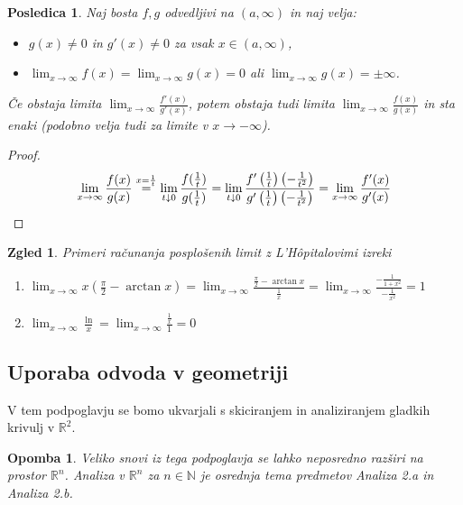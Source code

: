 \documentclass[10pt, a4paper]{article}
\newtheorem{posledica}[izr]{Posledica}
\newtheorem*{opomba}{Opomba}
\newtheorem{zgled}[izr]{Zgled}
\newenvironment{noticeC}{%
  \tcolorbox[%
  notitle,
  empty,
  enhanced,  %
  breakable,
  coltext=black, 
  fontupper=\rmfamily,
  noparskip,
  sharp corners,
  boxrule=-1pt,  %
  frame hidden,
  left=7pt,  %
  right=7pt,
  top=5pt,
  bottom=5pt,
  before skip=2.5ex plus 2pt,
  after skip=2.5ex plus 2pt,
  overlay unbroken and last={%
  },
  ]}
{\endtcolorbox}
\newenvironment{dokaz}%
  {\begin{noticeC}\begin{proof}}%
  {\end{proof}\end{noticeC}}
\newcommand{\N}{\mathbb {N}}
\newcommand{\R}{\mathbb {R}}
\newcommand{\limf}[3]{\lim_{#1 \to #2} {#3}}
\newcommand{\rlimf}[3]{\lim_{#1 \downarrow #2} {#3}}
\begin{document}
\begin{posledica}
    Naj bosta $f,g$ odvedljivi na $(a, \infty)$ in naj velja:
    \begin{itemize}
        \item $g(x) \neq 0$ in $g'(x) \neq 0$ za vsak $x \in (a,\infty)$,
        \item $\displaystyle \limf{x}{\infty}{f(x)} = \limf{x}{\infty}{g(x)} = 0$ ali $\limf{x}{\infty}{g(x)} = \pm \infty$.
    \end{itemize}
    Če obstaja limita $\limf{x}{\infty}{\frac{f'(x)}{g'(x)}}$, potem obstaja tudi limita $\limf{x}{\infty}{\frac{f(x)}{g(x)}}$ in sta enaki (podobno velja tudi za limite v $x \rightarrow - \infty$).
\end{posledica}
    
\begin{dokaz}
    \begin{equation*}
        \limf{x}{\infty}{\frac{f(x)}{g(x)}} \stackrel{x = \frac{1}{t}}{=} \rlimf{t}{0}{\frac{f(\frac{1}{t})}{g(\frac{1}{t})}} = \rlimf{t}{0}{\frac{f' \left(\frac{1}{t} \right) \left(- \frac{1}{t^2} \right)}{g' \left(\frac{1}{t} \right) \left(- \frac{1}{t^2} \right)}} = \limf{x}{\infty}{\frac{f'(x)}{g'(x)}} \qedhere
    \end{equation*}
\end{dokaz}
\clearpage
    \begin{zgled}
    Primeri računanja posplošenih limit z L'Hôpitalovimi izreki
    \begin{enumerate}
        \item $\displaystyle \limf{x}{\infty}{x \left(\frac{\pi}{2} - \arctan x\right)} = \limf{x}{\infty}{\frac{\frac{\pi}{2} - \arctan x}{\frac{1}{x}}} = \limf{x}{\infty}{\frac{- \frac{1}{1 + x^2}}{- \frac{1}{x^2}}} = 1$
        \item $\displaystyle \limf{x}{\infty}{\frac{\ln}{x}} = \limf{x}{\infty}{\frac{\frac{1}{x}}{1}} = 0$
    \end{enumerate}
\end{zgled}

\subsection{Uporaba odvoda v geometriji}

V tem podpoglavju se bomo ukvarjali s skiciranjem in analiziranjem gladkih krivulj v $\R^2.$

\begin{opomba}
    Veliko snovi iz tega podpoglavja se lahko neposredno razširi na prostor $\R^n$.
    Analiza v $\R^n$ za $n \in \N$ je osrednja tema predmetov Analiza 2.a in Analiza 2.b.
\end{opomba}
\end{document}
